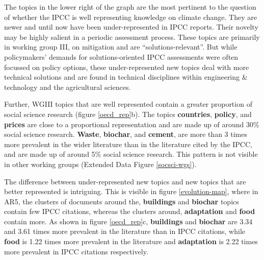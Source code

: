 \documentclass{article}
\begin{document}
\begin{linenumbers}
		The topics in the lower right of the graph are the most pertinent to the question of whether the IPCC is well representing knowledge on climate change. They are newer and until now have been under-represented in IPCC reports. Their novelty may be highly salient in a periodic assessment process. These topics are primarily in working group III, on mitigation and are ``solutions-relevant''. But while policymakers' demands for solutions-oriented IPCC assessments were often focussed on policy options, these under-represented new topics deal with more technical solutions and are found in technical disciplines within engineering \& technology and the agricultural sciences.
		
		Further, WGIII topics that are well represented contain a greater proportion of social science research (figure \ref{oecd_rep}b). The topics \textbf{countries}, \textbf{policy}, and \textbf{prices} are close to a proportional representation and are made up of around 30\% social science research. \textbf{Waste}, \textbf{biochar}, and \textbf{cement}, are more than 3 times more prevalent in the wider literature than in the literature cited by the IPCC, and are made up of around 5\% social science research. This pattern is not visible in other working groups (Extended Data Figure \ref{socsci-wgs}).
		
		The difference between under-represented new topics and new topics that are better represented is intriguing. This is visible in figure \ref{evolution-map}, where in AR5, the clusters of documents around the, \textbf{buildings} and \textbf{biochar} topics contain few IPCC citations, whereas the clusters around, \textbf{adaptation} and \textbf{food} contain more. As shown in figure \ref{oecd_rep}c, \textbf{buildings} and \textbf{biochar} are 3.34 and 3.61 times more prevalent in the literature than in IPCC citations, while \textbf{food} is 1.22 times more prevalent in the literature and \textbf{adaptation} is 2.22 times more prevalent in IPCC citations respectively. %
		

		


\end{linenumbers}
\end{document}
